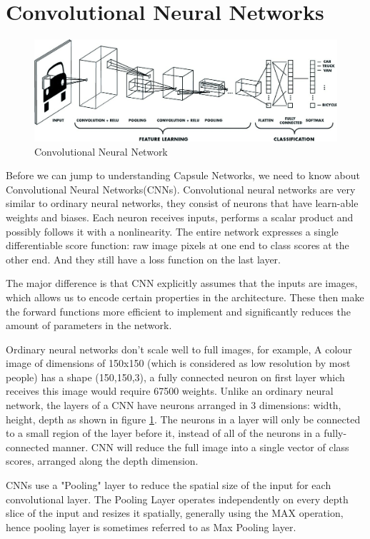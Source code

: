 \section{Convolutional Neural Networks} %
\label{sec:convolutional_neural_networks}

\begin{figure}[H]
\centering\includegraphics[width=.7\textwidth]{images/CNN.jpg}
\caption{Convolutional Neural Network}
\label{fig:cnn}
\end{figure}
Before we can jump to understanding Capsule Networks, we need to know about Convolutional Neural Networks(CNNs). Convolutional neural networks are very similar to ordinary neural networks, they consist of neurons that have learn-able weights and biases. Each neuron receives inputs, performs a scalar product and possibly follows it with a nonlinearity. The entire network expresses a single differentiable score function: raw image pixels at one end to class scores at the other end. And they still have a loss function on the last layer.\par\bigskip
The major difference is that CNN explicitly assumes that the inputs are images, which allows us to encode certain properties in the architecture. These then make the forward functions more efficient to implement and significantly reduces the amount of parameters in the network.\par\bigskip
Ordinary neural networks don’t scale well to full images, for example, A colour image of dimensions of 150x150 (which is considered as low resolution by most people) has a shape (150,150,3), a fully connected neuron on first layer which receives this image would require 67500 weights. Unlike an ordinary neural network, the layers of a CNN have neurons arranged in 3 dimensions: width, height, depth as shown in figure \ref{fig:cnn}. The neurons in a layer will only be connected to a small region of the layer before it, instead of all of the neurons in a fully-connected manner. CNN  will reduce the full image into a single vector of class scores, arranged along the depth dimension.\par\bigskip
CNNs use a "Pooling" layer to reduce the spatial size of the input for each convolutional layer. The Pooling Layer operates independently on every depth slice of the input and resizes it spatially, generally using the MAX operation, hence pooling layer is sometimes referred to as Max Pooling layer.


